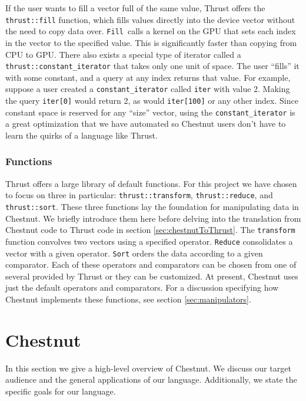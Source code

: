 \documentclass[twocolumn]{article}
\renewcommand{\|}{\origbar} %
\newcommand{\code}[1]{\texttt{#1}}
\begin{document}
If the user wants to fill a vector full of the same value, Thrust offers the \code{thrust::fill} function, which fills values directly into the device vector without the need to copy data over. \code{Fill}~calls a kernel on the GPU that sets each index in the vector to the specified value. This is significantly faster than copying from CPU to GPU. There also exists a special type of iterator called a \code{thrust::constant\_iterator} that takes only one unit of space. The user ``fills'' it with some constant, and a query at any index returns that value. For example, suppose a user created a \code{constant\_iterator} called \code{iter} with value 2. Making the query \code{iter[0]} would return 2, as would \code{iter[100]} or any other index. Since constant space is reserved for any ``size'' vector, using  the \code{constant\_iterator} is a great optimization that we have automated so Chestnut users don't have to learn the quirks of a language like Thrust. 

\subsubsection{Functions}

Thrust offers a large library of default functions. For this project we have chosen to focus on three in particular: \code{thrust::transform}, \code{thrust::reduce}, and \code{thrust::sort}. These three functions lay the foundation for manipulating data in Chestnut. We briefly introduce them here before delving into the translation from Chestnut code to Thrust code in section \ref{sec:chestnutToThrust}. The \code{transform} function convolves two vectors using a specified operator. \code{Reduce} consolidates a vector with a given operator. \code{Sort} orders the data according to a given comparator. Each of these operators and comparators can be chosen from one of several provided by Thrust or they can be customized. At present, Chestnut uses just the default operators and comparators. For a discussion specifying how Chestnut implements these functions, see section \ref{sec:manipulators}.

\section{Chestnut}
\label{sec:chestnut}

In this section we give a high-level overview of Chestnut. We discuss our target audience and the general applications of our language. Additionally, we state the specific goals for our language.
\end{document}
